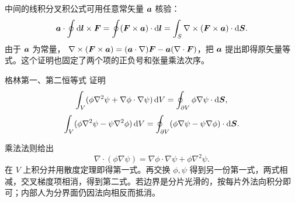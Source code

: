 中间的线积分叉积公式可用任意常矢量 $\bm{a}$ 核验：
\[
 \bm{a}\cdot\oint\mathop{}\!\mathrm d\bm{l}\times\bm{F}
 =\oint(\bm{F}\times\bm{a})\cdot\mathop{}\!\mathrm d\bm{l}
 =\int_S\nabla\times(\bm{F}\times\bm{a})\cdot\mathop{}\!\mathrm d\bm{S}.
\]
由于 $\bm{a}$ 为常量，
$\nabla\times(\bm{F}\times\bm{a})
=(\bm{a}\cdot\nabla)\bm{F}-\bm{a}(\nabla\cdot\bm{F})$，把 $\bm{a}$ 提出即得原矢量等式。这个证明也固定了两个项的正负号和张量乘法次序。

\begin{advexamplebox}{格林第一、第二恒等式}\label{advA3:ex:green-identities}
证明
\[
 \int_V(\phi\nabla^2\psi+\nabla\phi\cdot\nabla\psi)\mathop{}\!\mathrm d V
 =\oint_{\partial V}\phi\nabla\psi\cdot\mathop{}\!\mathrm d\bm{S},
\]
\[
 \int_V(\phi\nabla^2\psi-\psi\nabla^2\phi)\mathop{}\!\mathrm d V
 =\oint_{\partial V}(\phi\nabla\psi-\psi\nabla\phi)\cdot\mathop{}\!\mathrm d\bm{S}.
\]

\AQGreen
\end{advexamplebox}
\begin{advsolution}
\AAGreen

乘法法则给出
\[
 \nabla\cdot(\phi\nabla\psi)
 =\nabla\phi\cdot\nabla\psi+\phi\nabla^2\psi.
\]
在 $V$ 上积分并用散度定理即得第一式。再交换 $\phi,\psi$ 得到另一份第一式，两式相减，交叉梯度项相消，得到第二式。若边界是分片光滑的，按每片外法向积分即可；内部人为分界面仍因法向相反而抵消。
\end{advsolution}
